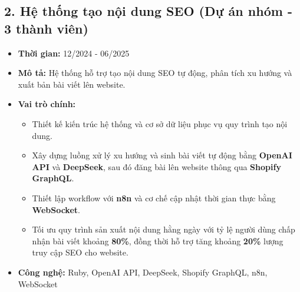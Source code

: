 \documentclass[a4paper,10pt]{article}
\begin{document}
\subsection*{2. Hệ thống tạo nội dung SEO \hfill \small (Dự án nhóm - 3 thành viên)}
\begin{itemize}
    \item \textbf{Thời gian:} 12/2024 - 06/2025
    \item \textbf{Mô tả:} Hệ thống hỗ trợ tạo nội dung SEO tự động, phân tích xu hướng và xuất bản bài viết lên website.
    \item \textbf{Vai trò chính:}
    \begin{itemize}
        \item Thiết kế kiến trúc hệ thống và cơ sở dữ liệu phục vụ quy trình tạo nội dung.
        \item Xây dựng luồng xử lý xu hướng và sinh bài viết tự động bằng \textbf{OpenAI API} và \textbf{DeepSeek}, sau đó đăng bài lên website thông qua \textbf{Shopify GraphQL}.
        \item Thiết lập workflow với \textbf{n8n} và cơ chế cập nhật thời gian thực bằng \textbf{WebSocket}.
        \item Tối ưu quy trình sản xuất nội dung hằng ngày với tỷ lệ người dùng chấp nhận bài viết khoảng \textbf{80\%}, đồng thời hỗ trợ tăng khoảng \textbf{20\%} lượng truy cập SEO cho website.
    \end{itemize}
    \item \textbf{Công nghệ:} Ruby, OpenAI API, DeepSeek, Shopify GraphQL, n8n, WebSocket
\end{itemize}
\end{document}
